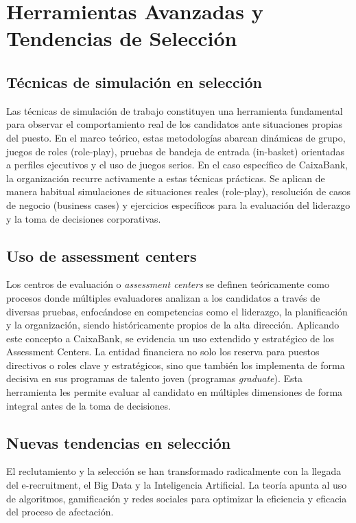 
\section{Herramientas Avanzadas y Tendencias de Selección}

\subsection{Técnicas de simulación en selección}
Las técnicas de simulación de trabajo constituyen una herramienta fundamental para observar el comportamiento real de los candidatos ante situaciones propias del puesto. En el marco teórico, estas metodologías abarcan dinámicas de grupo, juegos de roles (role-play), pruebas de bandeja de entrada (in-basket) orientadas a perfiles ejecutivos y el uso de juegos serios. En el caso específico de CaixaBank, la organización recurre activamente a estas técnicas prácticas. Se aplican de manera habitual simulaciones de situaciones reales (role-play), resolución de casos de negocio (business cases) y ejercicios específicos para la evaluación del liderazgo y la toma de decisiones corporativas.

\subsection{Uso de assessment centers}
Los centros de evaluación o \textit{assessment centers} se definen teóricamente como procesos donde múltiples evaluadores analizan a los candidatos a través de diversas pruebas, enfocándose en competencias como el liderazgo, la planificación y la organización, siendo históricamente propios de la alta dirección. Aplicando este concepto a CaixaBank, se evidencia un uso extendido y estratégico de los Assessment Centers. La entidad financiera no solo los reserva para puestos directivos o roles clave y estratégicos, sino que también los implementa de forma decisiva en sus programas de talento joven (programas \textit{graduate}). Esta herramienta les permite evaluar al candidato en múltiples dimensiones de forma integral antes de la toma de decisiones.

\subsection{Nuevas tendencias en selección}
El reclutamiento y la selección se han transformado radicalmente con la llegada del e-recruitment, el Big Data y la Inteligencia Artificial. La teoría apunta al uso de algoritmos, gamificación y redes sociales para optimizar la eficiencia y eficacia del proceso de afectación.

